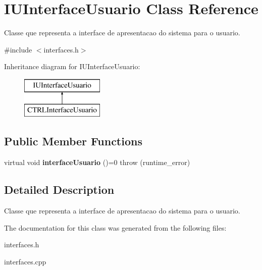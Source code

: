 \hypertarget{classIUInterfaceUsuario}{}\section{I\+U\+Interface\+Usuario Class Reference}
\label{classIUInterfaceUsuario}


Classe que representa a interface de apresentacao do sistema para o usuario.  




{\ttfamily \#include $<$interfaces.\+h$>$}

Inheritance diagram for I\+U\+Interface\+Usuario\+:\begin{figure}[H]
\begin{center}
\leavevmode
\includegraphics[height=2.000000cm]{classIUInterfaceUsuario}
\end{center}
\end{figure}
\subsection*{Public Member Functions}
\begin{DoxyCompactItemize}
\item 
\mbox{\label{classIUInterfaceUsuario_af7d703b8e50777fd1258037fb0ddb3e4}} 
virtual void {\bfseries interface\+Usuario} ()=0  throw (runtime\+\_\+error)
\end{DoxyCompactItemize}


\subsection{Detailed Description}
Classe que representa a interface de apresentacao do sistema para o usuario. 

The documentation for this class was generated from the following files\+:\begin{DoxyCompactItemize}
\item 
interfaces.\+h\item 
interfaces.\+cpp\end{DoxyCompactItemize}
